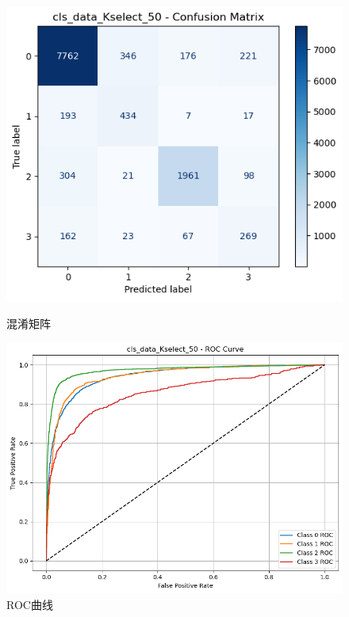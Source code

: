\documentclass[10pt]{article}
\begin{document}
\begin{figure}[H]
\centering
\begin{minipage}[t]{0.45\textwidth}
  \centering
  \includegraphics[width=\linewidth]{cls_lda_50s.png}
  \caption{混淆矩阵}
  \label{fig:51}
\end{minipage}
\hfill
\begin{minipage}[t]{0.52\textwidth}
  \centering
  \includegraphics[width=\linewidth]{cls_lda_50s2.png}
  \caption{ROC曲线}
  \label{fig:52}
\end{minipage}
\end{figure}
\end{document}
